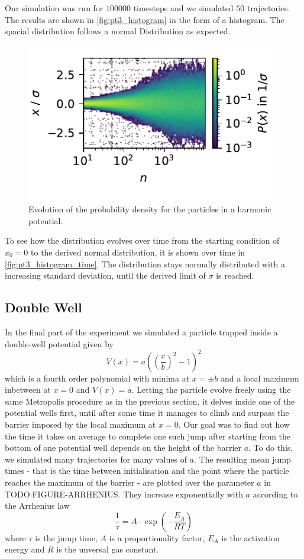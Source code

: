 \documentclass[
    parskip=half, 
    twoside=false,
    twocolumn=true,
    fontsize=11pt,
]{scrarticle}
\begin{document}
Our simulation was run for $100000$ timesteps and we simulated $50$ trajectories. 
The results are shown in \autoref{fig:pt3_histogram} in the form of a histogram.
The spacial distribution follows a normal Distribution as expected.


\begin{figure}
    \centering
    \includegraphics{figures/03 histogram evolution.pdf}
    \caption{
        Evolution of the probability density for the particles in a harmonic potential.
    }
    \label{fig:pt3_histogram_time}
\end{figure}
To see how the distribution evolves over time from the starting condition of $x_0=0$ to the derived normal distribution, it is shown over time in \autoref{fig:pt3_histogram_time}.
The distribution stays normally distributed with a increasing standard deviation, until the derived limit of $\sigma$ is reached.

\subsection{Double Well}

In the final part of the experiment we simulated a particle trapped inside a double-well potential given by
\begin{equation}
 V(x) = a\left(\left(\frac{x}{b}\right)^2-1\right)^2
\end{equation}
which is a fourth order polynomial with minima at $x=\pm b$ and a local maximum inbetween at $x=0$ and $V(x)=a$. Letting the particle evolve freely using the same Metropolis procedure as in the previous section, it delves inside one of the potential wells first, until after some time it manages to climb and surpass the barrier imposed by the local maximum at $x=0$. Our goal was to find out how the time it takes on average to complete one such jump after starting from the bottom of one potential well depends on the height of the barrier $a$. To do this, we simulated many trajectories for many values of $a$. The resulting mean jump times - that is the time between initialisation and the point where the particle reaches the maximum of the barrier - are plotted over the parameter $a$ in TODO:FIGURE-ARRHENIUS. They increase exponentially with $a$ according to the Arrhenius law
\begin{equation}
 \frac{1}{\tau} = A \cdot \exp\left(-\frac{E_A}{R T}\right)
\end{equation}
where $\tau$ is the jump time, $A$ is a proportionality factor, $E_A$ is the activation energy and $R$ is the unversal gas constant.
\end{document}
